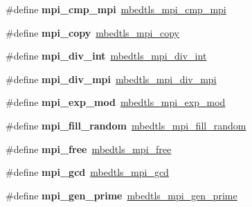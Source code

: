 \begin{DoxyCompactItemize}
\#define {\bfseries mpi\+\_\+cmp\+\_\+mpi}~\mbox{\hyperlink{bignum_8h_a762dd8add46384d4935a4aecc125096e}{mbedtls\+\_\+mpi\+\_\+cmp\+\_\+mpi}}
\item 
\mbox{\label{compat-1_83_8h_ac93ac510f2a5e0f95655d0ee2bd65056}} 
\#define {\bfseries mpi\+\_\+copy}~\mbox{\hyperlink{bignum_8h_a2f722863f9fd9098690f8a9db9962044}{mbedtls\+\_\+mpi\+\_\+copy}}
\item 
\mbox{\label{compat-1_83_8h_a64f48ffc7813d335193463ab011e4bd2}} 
\#define {\bfseries mpi\+\_\+div\+\_\+int}~\mbox{\hyperlink{bignum_8h_a7ffac96dd27bbe62dba7c6307edd2c60}{mbedtls\+\_\+mpi\+\_\+div\+\_\+int}}
\item 
\mbox{\label{compat-1_83_8h_ae4e94747cbb93c4517db5bd642dcbe2f}} 
\#define {\bfseries mpi\+\_\+div\+\_\+mpi}~\mbox{\hyperlink{bignum_8h_a5f3db711e21b4fe2f1a009099478e796}{mbedtls\+\_\+mpi\+\_\+div\+\_\+mpi}}
\item 
\mbox{\label{compat-1_83_8h_ad36f2526fd6f46782b9f61fb870b3556}} 
\#define {\bfseries mpi\+\_\+exp\+\_\+mod}~\mbox{\hyperlink{bignum_8h_a55433a16c951178e2b98a01c6386239e}{mbedtls\+\_\+mpi\+\_\+exp\+\_\+mod}}
\item 
\mbox{\label{compat-1_83_8h_a616620fb4c8d6896a0f737e89481615d}} 
\#define {\bfseries mpi\+\_\+fill\+\_\+random}~\mbox{\hyperlink{bignum_8h_a81b99c0a79d3e8ddedfd4a6ee37ceb1e}{mbedtls\+\_\+mpi\+\_\+fill\+\_\+random}}
\item 
\mbox{\label{compat-1_83_8h_af8954b47b7c64e800f4531f4587d266c}} 
\#define {\bfseries mpi\+\_\+free}~\mbox{\hyperlink{bignum_8h_abffd5d8382cb86c089a1ef2bebb90f9f}{mbedtls\+\_\+mpi\+\_\+free}}
\item 
\mbox{\label{compat-1_83_8h_a8b63c5e2171cf946397edd7216ca3898}} 
\#define {\bfseries mpi\+\_\+gcd}~\mbox{\hyperlink{bignum_8h_aeebcfa54676b583d2e767b1c01c9844f}{mbedtls\+\_\+mpi\+\_\+gcd}}
\item 
\mbox{\label{compat-1_83_8h_a51d5cff807bd485e42b5c83661287ec6}} 
\#define {\bfseries mpi\+\_\+gen\+\_\+prime}~\mbox{\hyperlink{bignum_8h_ad1267890b0187b0a73ce0e7ce4ab4929}{mbedtls\+\_\+mpi\+\_\+gen\+\_\+prime}}

\end{DoxyCompactItemize}
